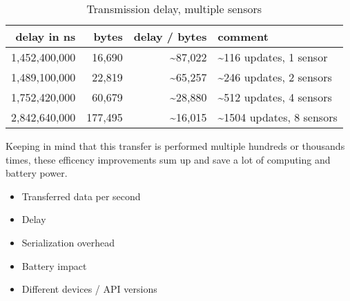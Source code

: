 \begin{table}[H]
	\begin{tabular}{rrrl}
		delay in ns       & bytes             & delay / bytes     & comment \\ \hline

		1,452,400,000     & 16,690            & \textasciitilde87,022           & \textasciitilde116 updates,  1 sensor \\
		1,489,100,000     & 22,819            & \textasciitilde65,257           & \textasciitilde246 updates,  2 sensors \\
		1,752,420,000     & 60,679            & \textasciitilde28,880           & \textasciitilde512 updates,  4 sensors \\
		2,842,640,000     & 177,495           & \textasciitilde16,015           & \textasciitilde1504 updates, 8 sensors \\
	\end{tabular}
	\caption{Transmission delay, multiple sensors}
	\label{table:benchmark:transmissiondelay:multiple}
\end{table}

Keeping in mind that this transfer is performed multiple hundreds or thousands times, these efficency improvements sum up and save a lot of computing and battery power.

\begin{itemize}[noitemsep]
	\item Transferred data per second
	\item Delay
	\item Serialization overhead
	\item Battery impact
	\item Different devices / API versions
\end{itemize}

\clearpage